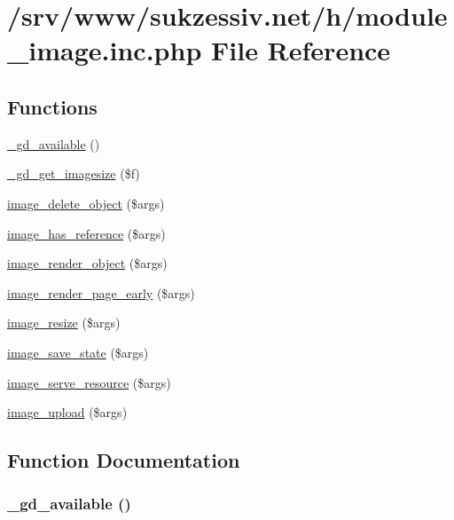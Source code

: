 \hypertarget{module__image_8inc_8php}{
\section{/srv/www/sukzessiv.net/h/module\_\-image.inc.php File Reference}
\label{module__image_8inc_8php}
}
\subsection*{Functions}
\begin{CompactItemize}
\item 
\hyperlink{module__image_8inc_8php_574d6d760e50b88ffa815cab30a5e634}{\_\-gd\_\-available} ()
\item 
\hyperlink{module__image_8inc_8php_3c76028c34273e722c9691243377a208}{\_\-gd\_\-get\_\-imagesize} (\$f)
\item 
\hyperlink{module__image_8inc_8php_7cbcf6138ccff16a8b733cfd6f0f1666}{image\_\-delete\_\-object} (\$args)
\item 
\hyperlink{module__image_8inc_8php_0bef6164f5eafe368d251639cf6fe298}{image\_\-has\_\-reference} (\$args)
\item 
\hyperlink{module__image_8inc_8php_4fadded2a225d1b5ea73404a84597620}{image\_\-render\_\-object} (\$args)
\item 
\hyperlink{module__image_8inc_8php_8266a74a11a86a73e2aa3709388fd43f}{image\_\-render\_\-page\_\-early} (\$args)
\item 
\hyperlink{module__image_8inc_8php_9e03a71310133176236ae0bd4a0241e0}{image\_\-resize} (\$args)
\item 
\hyperlink{module__image_8inc_8php_c26ea1448f0b7ed835907cf7c22b60ca}{image\_\-save\_\-state} (\$args)
\item 
\hyperlink{module__image_8inc_8php_bb6646bfaa6a012e620cdaaa0bc3c807}{image\_\-serve\_\-resource} (\$args)
\item 
\hyperlink{module__image_8inc_8php_37dee9de60e2852c0631d8e60e58585c}{image\_\-upload} (\$args)
\end{CompactItemize}


\subsection{Function Documentation}
\hypertarget{module__image_8inc_8php_574d6d760e50b88ffa815cab30a5e634}{
\subsubsection[{\_\-gd\_\-available}]{\setlength{\rightskip}{0pt plus 5cm}\_\-gd\_\-available ()}}
\label{module__image_8inc_8php_574d6d760e50b88ffa815cab30a5e634}


